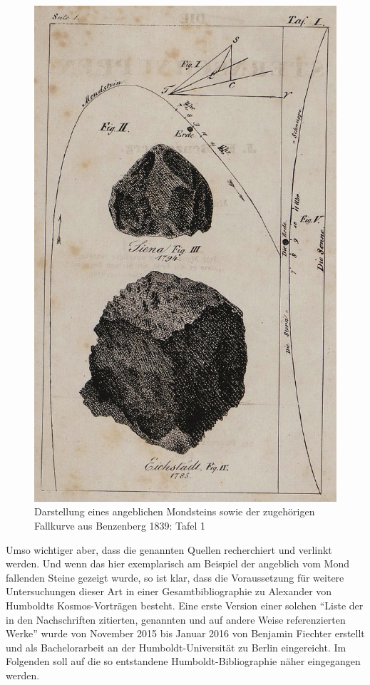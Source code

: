 \documentclass[a4paper,
fontsize=11pt,
oneside,
numbers=noperiodatend,
parskip=half-,
bibliography=totoc,
final
]{scrartcl}
\begin{document}
\begin{figure}[htbp]
\centering
\includegraphics{img/02.jpg}
\caption{Darstellung eines angeblichen Mondsteins sowie der zugehörigen
Fallkurve aus Benzenberg 1839: Tafel 1}
\end{figure}

Umso wichtiger aber, dass die genannten Quellen recherchiert und
verlinkt werden. Und wenn das hier exemplarisch am Beispiel der
angeblich vom Mond fallenden Steine gezeigt wurde, so ist klar, dass die
Voraussetzung für weitere Untersuchungen dieser Art in einer
Gesamtbibliographie zu Alexander von Humboldts Kosmos-Vorträgen besteht.
Eine erste Version einer solchen \enquote{Liste der in den Nachschriften
zitierten, genannten und auf andere Weise referenzierten Werke} wurde
von November 2015 bis Januar 2016 von Benjamin Fiechter erstellt und als
Bachelorarbeit an der Humboldt-Universität zu Berlin eingereicht. Im
Folgenden soll auf die so entstandene Humboldt-Bibliographie näher
eingegangen werden.
\end{document}
